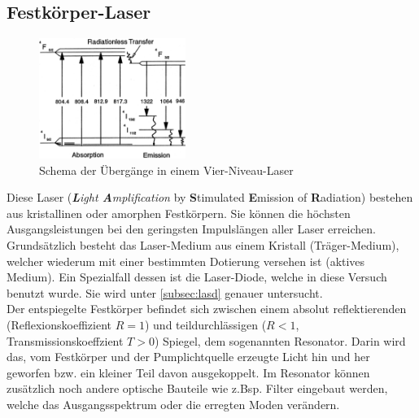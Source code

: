 \documentclass[numbers=noenddot,12pt,a4paper]{scrartcl}
\newcommand{\tilt}[1]{\textit{#1}}
\begin{document}
\subsection{Festkörper-Laser}\label{subsec:fklaser}
\begin{figure}
	\centering
	\includegraphics[width=0.425\textwidth]{uebergaenge.png}
	\caption{Schema der Übergänge in einem Vier-Niveau-Laser}\label{img:ueber}
\end{figure}
Diese Laser (\tilt{\textbf{L}ight \textbf{A}mplification} by \textbf{S}timulated \textbf{E}mission of \textbf{R}adiation) bestehen aus kristallinen oder amorphen Festkörpern. Sie können die höchsten Ausgangsleistungen bei den geringsten Impulslängen aller Laser erreichen. Grundsätzlich besteht das Laser-Medium aus einem Kristall (Träger-Medium), welcher wiederum mit einer bestimmten Dotierung versehen ist (aktives Medium). Ein Spezialfall dessen ist die Laser-Diode, welche in diese Versuch benutzt wurde. Sie wird unter \ref{subsec:lasd} genauer untersucht.\\
Der entspiegelte Festkörper befindet sich zwischen einem absolut reflektierenden (Reflexionskoeffizient $R=1$) und teildurchlässigen ($R<1$, Transmissionskoeffzient $T>0$) Spiegel, dem sogenannten Resonator. Darin wird das, vom Festkörper und der Pumplichtquelle erzeugte Licht hin und her geworfen bzw. ein kleiner Teil davon ausgekoppelt. Im Resonator können zusätzlich noch andere optische Bauteile wie z.Bsp. Filter eingebaut werden, welche das Ausgangsspektrum oder die erregten Moden verändern.\\
\end{document}
